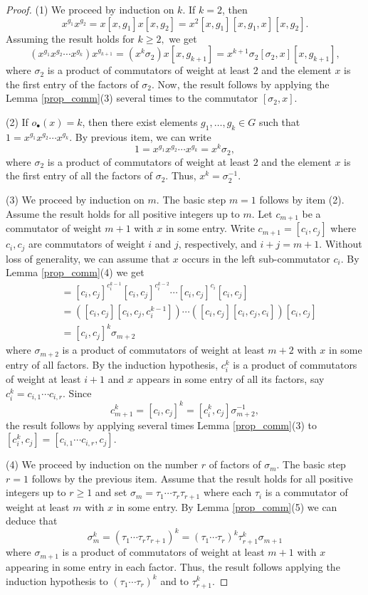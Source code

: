 \documentclass[10pt,a4paper]{amsart}
\begin{document}
\begin{proof}
(1) We proceed by induction on $k.$ If $k=2$, then 
$$x^{g_1}x^{g_2}=x[x,g_1]x[x,g_2]=x^2[x,g_1][x,g_1,x][x,g_2].$$ Assuming the result holds for $k\geq 2,$ we get 
$$(x^{g_1}x^{g_2}\cdots x^{g_k})x^{g_{k+1}}=(x^k\sigma_2)x[x,g_{k+1}]=x^{k+1}\sigma_2[\sigma_2,x][x,g_{k+1}],$$ where $\sigma_2$ is a product of commutators of weight at least $2$ and the element $x$ is the first entry of the factors of $\sigma_2$. 
Now, the result follows by applying the Lemma \ref{prop_comm}(3) several times to the commutator $[\sigma_2,x]$.

(2)  If $o_{\bullet}(x)=k$, then there exist elements $g_1,\ldots, g_k\in G$ such that   $1=x^{g_1}x^{g_2}\cdots x^{g_k}$. By previous item, we can write $$1=x^{g_1}x^{g_2}\cdots x^{g_k}=x^k\sigma_2,$$ 
where $\sigma_2$ is a product of commutators of weight at least $2$ and the element $x$ is the first entry of all the factors of $\sigma_2$. Thus, $x^k=\sigma_2^{-1}$.

(3)  We proceed by induction on $m$. The basic step $m=1$ follows by item (2). Assume the result holds for all positive integers up to $m$. Let $c_{m+1}$ be a commutator of weight $m+1$ with $x$ in some entry.  Write $c_{m+1}=[c_i,c_j]$ where $c_i, c_j$ are commutators of weight $i$ and $j$, respectively, and $i+j=m+1.$ Without loss of generality, we can assume that $x$ occurs in the left sub-commutator $c_i$. By Lemma \ref{prop_comm}(4) we get
\begin{align*}
   [c_i^k,c_j]& =    [c_i,c_j]^{c_i^{k-1}}[c_i,c_j]^{c_i^{k-2}}\cdots [c_i,c_j]^{c_i}[c_i,c_j]\\
    & =    ([c_i,c_j][c_i,c_j,c_i^{k-1}])
    \cdots ([c_i,c_j][c_i,c_j,c_i])[c_i,c_j]\\
    & =  [c_i,c_j]^k\sigma_{m+2}
\end{align*}
where $\sigma_{m+2}$ is a product of commutators of weight at least $m+2$ with $x$ in some entry of all factors. By the induction hypothesis, $c_i^k$ is a product of commutators of weight at least $i+1$  and $x$ appears in some entry of all its factors, say $c_i^k=c_{i,1}\cdots c_{i,r}$. Since 
\[
c_{m+1}^k=[c_i,c_j]^k=[c_i^k,c_j]\sigma_{m+2}^{-1},
\]
the result follows by applying several times Lemma \ref{prop_comm}(3) to $[c_i^k,c_j]=[c_{i,1}\cdots c_{i,r},c_j]$.


(4) We proceed by induction on the number $r$ of factors of $\sigma_m$. The basic step $r=1$ follows by the previous item. Assume that the result holds for all positive integers up to $r\geq 1$ and set $\sigma_m=\tau_1\cdots\tau_r\tau_{r+1}$ where each $\tau_i$ is a commutator of weight at least $m$ with $x$ in some entry. By Lemma \ref{prop_comm}(5) we can deduce that 
$$\sigma_m^k=(\tau_1\cdots\tau_r\tau_{r+1})^k=(\tau_1\cdots\tau_r)^k\tau_{r+1}^k\sigma_{m+1}$$
where $\sigma_{m+1}$ is a product of commutators of weight at least $m+1$ with $x$ appearing in some entry in each factor. Thus, the result follows applying the induction hypothesis to $(\tau_1\cdots\tau_r)^k$ and to $\tau_{r+1}^k$. 


\end{proof}
\end{document}
